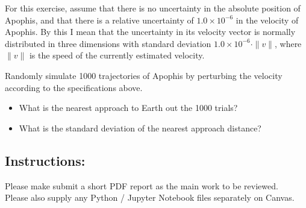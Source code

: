 \documentclass{article}
\begin{document}
For this exercise, assume that there is no uncertainty in the absolute position of Apophis,
and that there is a relative uncertainty of $1.0 \times 10^{-6}$ in the velocity of Apophis.
By this I mean that the uncertainty in its velocity vector is normally distributed in three dimensions
with standard deviation $1.0 \times 10^{-6} \cdot \|v\|$, 
where $\|v\|$ is the speed of the currently estimated velocity.

Randomly simulate 1000 trajectories of Apophis by perturbing the velocity 
according to the specifications above.
\begin{itemize}
\item What is the nearest approach to Earth out the 1000 trials?
\item What is the standard deviation of the nearest approach distance?
\end{itemize}

\subsection*{Instructions:}
Please make submit a short PDF report as the main work to be reviewed.\\
Please also supply any Python / Jupyter Notebook files separately on Canvas.
\end{document}
